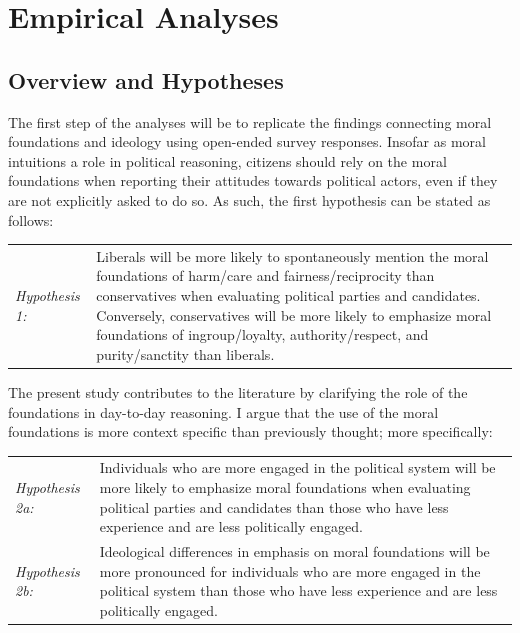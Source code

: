 \documentclass[12pt]{article}
\begin{document}
\section{Empirical Analyses}

\subsection{Overview and Hypotheses}

The first step of the analyses will be to replicate the findings connecting moral foundations and ideology using open-ended survey responses. Insofar as moral intuitions a role in political reasoning, citizens should rely on the moral foundations when reporting their attitudes towards political actors, even if they are not explicitly asked to do so. As such, the first hypothesis can be stated as follows:

\vspace{0.3cm}
\begin{tabular}{lp{12cm}}
\textsl{Hypothesis 1:} & Liberals will be more likely to spontaneously mention the moral foundations of harm/care and fairness/reciprocity  than conservatives when evaluating political parties and candidates. Conversely, conservatives will be more likely to emphasize moral foundations of ingroup/loyalty, authority/respect, and purity/sanctity than liberals.
\end{tabular}
\vspace{0.5cm}

The present study contributes to the literature by clarifying the role of the foundations in day-to-day reasoning. I argue that the use of the moral foundations is more context specific than previously thought; more specifically:

\vspace{0.3cm}
\begin{tabular}{lp{12cm}}
\textsl{Hypothesis 2a:} & Individuals who are more engaged in the political system will be more likely to emphasize moral foundations when evaluating political parties and candidates than those who have less experience and are less politically engaged. \\
\textsl{Hypothesis 2b:} & Ideological differences in emphasis on moral foundations will be more pronounced for individuals who are more engaged in the political system than those who have less experience and are less politically engaged.
\end{tabular}
\vspace{0.5cm}
\end{document}
